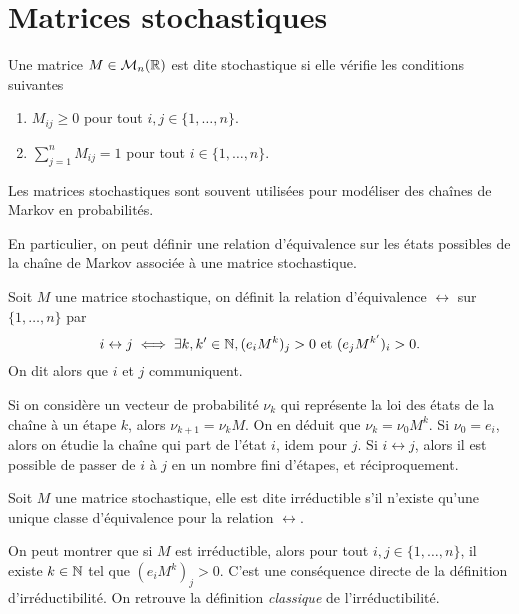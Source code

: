 \documentclass[../main.tex]{subfiles}
\begin{document}
\section{Matrices stochastiques}
\begin{definition} Une matrice \(M\in\mathcal{M}_n(\mathbb{R})\) est dite stochastique si elle vérifie les conditions suivantes
    \begin{enumerate}
        \item \(M_{ij}\ge 0\) pour tout \(i,j\in\{1,\ldots,n\}\).
        \item \(\sum_{j=1}^n M_{ij} = 1\) pour tout \(i\in\{1,\ldots,n\}\).
    \end{enumerate}
    \begin{remark} Les matrices stochastiques sont souvent utilisées pour modéliser des chaînes de Markov en probabilités.
    \end{remark}
\end{definition}
En particulier, on peut définir une relation d'équivalence sur les états possibles de la chaîne de Markov associée à une matrice stochastique.
\begin{definition} Soit \(M\) une matrice stochastique, on définit la relation d'équivalence \(\longleftrightarrow\) sur \(\{1,\ldots,n\}\) par
    \begin{equation}
        i\leftrightarrow j \iff \exists k,k'\in\mathbb{N}, (e_iM^k)_j>0 \text{ et } (e_jM^{k'})_i>0.
    \end{equation}
    On dit alors que \(i\) et \(j\) communiquent.
    \begin{remark} Si on considère un vecteur de probabilité \(\nu_k\) qui représente la loi des états de la chaîne à un étape \(k\),
        alors \(\nu_{k+1} =  \nu_kM\). On en déduit que \(\nu_{k} = \nu_0M^k\). Si \(\nu_0 = e_i\), alors on étudie la chaîne qui part de l'état \(i\), idem pour \(j\).
        Si \(i\longleftrightarrow j\), alors il est possible de passer de \(i\) à \(j\) en un nombre fini d'étapes, et réciproquement.
    \end{remark}
\end{definition}
\begin{definition} Soit \(M\) une matrice stochastique, elle est dite irréductible s'il n'existe qu'une unique classe d'équivalence pour
    la relation \(\longleftrightarrow\).
    \begin{remark}
        On peut montrer que si \(M\) est irréductible, alors pour tout \(i,j\in\{1,\ldots,n\}\), il existe \(k\in\mathbb{N}\) tel que \((e_iM^k)_j>0\).
        C'est une conséquence directe de la définition d'irréductibilité. On retrouve la définition \textit{classique} de l'irréductibilité.
    \end{remark}
\end{definition}
\end{document}
